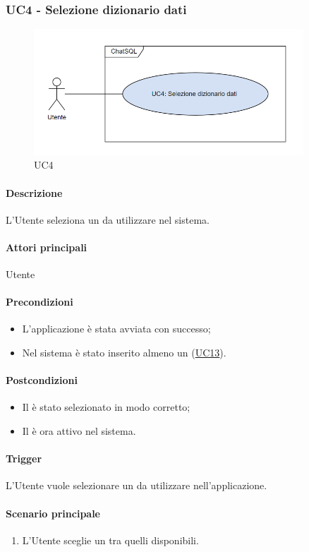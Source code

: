 \subsubsection{UC4 - Selezione dizionario dati}\label{UC4}

\begin{figure}[H]
  \centering
  \includegraphics[width=0.90\textwidth]{assets/uc4.png}
  \caption{UC4}
\end{figure}

\paragraph*{Descrizione}
L'Utente seleziona un  da utilizzare nel sistema.

\paragraph*{Attori principali}
Utente

\paragraph*{Precondizioni}
\begin{itemize}
  \item L'applicazione è stata avviata con successo;
  \item Nel sistema è stato inserito almeno un  (\hyperref[UC13]{UC13}).
\end{itemize}

\paragraph*{Postcondizioni}
\begin{itemize}
  \item Il  è stato selezionato in modo corretto;
  \item Il  è ora attivo nel sistema.
\end{itemize}

\paragraph*{Trigger}
L'Utente vuole selezionare un  da utilizzare nell'applicazione.

\paragraph*{Scenario principale}
\begin{enumerate}
  \item L'Utente sceglie un  tra quelli disponibili.
\end{enumerate}